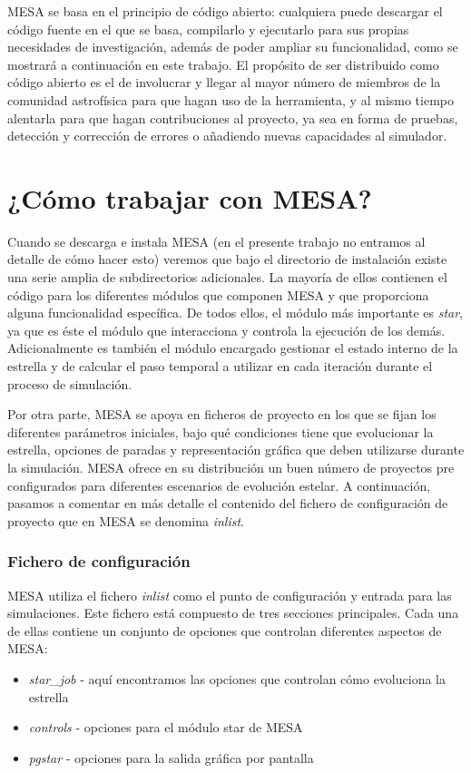 MESA se basa en el principio de código abierto: cualquiera puede descargar el código fuente en el que se basa, compilarlo y ejecutarlo para sus propias necesidades de investigación, además de poder ampliar su funcionalidad, como se mostrará a continuación en este trabajo. El propósito de ser distribuido como código abierto es el de involucrar y llegar al mayor número de miembros de la comunidad astrofísica para que hagan uso de la herramienta, y al mismo tiempo alentarla para que hagan contribuciones al proyecto, ya sea en forma de pruebas, detección y corrección de errores o añadiendo nuevas capacidades al simulador.\par

\section{¿Cómo trabajar con MESA?}
Cuando se descarga e instala MESA (en el presente trabajo no entramos al detalle de cómo hacer esto) veremos que bajo el directorio de instalación existe una serie amplia de subdirectorios adicionales. La mayoría de ellos contienen el código para los diferentes módulos que componen MESA y que proporciona alguna funcionalidad específica. De todos ellos, el módulo más importante es \textit{star}, ya que es éste el módulo que interacciona y controla la ejecución de los demás. Adicionalmente es también el módulo encargado gestionar el estado interno de la estrella y de calcular el paso temporal a utilizar en cada iteración durante el proceso de simulación.\par

Por otra parte, MESA se apoya en ficheros de proyecto en los que se fijan los diferentes parámetros iniciales, bajo qué condiciones tiene que evolucionar la estrella, opciones de paradas y representación gráfica que deben utilizarse durante la simulación. MESA ofrece en su distribución un buen número de proyectos pre configurados para diferentes escenarios de evolución estelar. 
A continuación, pasamos a comentar en más detalle el contenido del fichero de configuración de proyecto que en MESA se denomina \textit{inlist}.\par

\subsubsection{Fichero de configuración}
MESA utiliza el fichero \textit{inlist} como el punto de configuración y entrada para las simulaciones. Este fichero está compuesto de tres secciones principales. Cada una de ellas contiene un conjunto de opciones que controlan diferentes aspectos de MESA:
\begin{itemize}
    \item \textit{star\_job} - aquí encontramos las opciones que controlan cómo evoluciona la estrella
    \item \textit{controls} - opciones para el módulo star de MESA
    \item \textit{pgstar} - opciones para la salida gráfica por pantalla
\end{itemize}

